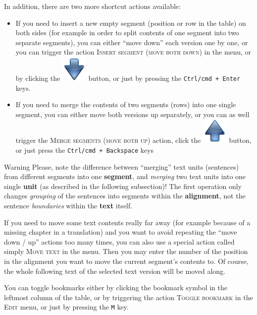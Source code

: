 \documentclass[a4paper,10pt,oneside]{book}
\newcommand{\keys}[1]{\texttt{#1}}
\newcommand{\menu}[1]{\textsc{#1}}
\begin{document}
In addition, there are two more shortcut actions available:

\begin{itemize}
 \item If you need to insert a new empty segment (position or row in the table) on both sides (for example in order to split contents of one segment into two separate segments), you can either ``move down'' each version one by one, or you can trigger the action \menu{Insert segment (move both down)} in the menu, or by clicking the \includegraphics[height=2ex]{../images/48/go-down.png} button, or just by pressing the \keys{Ctrl/cmd + Enter} keys.
 \item If you need to merge the contents of two segments (rows) into one single segment, you can either move both versions up separately, or you can as well trigger the \menu{Merge segments (move both up)} action, click the \includegraphics[height=2ex]{../images/48/go-up.png} button, or just press the \keys{Ctrl/cmd + Backspace} keys
\end{itemize}

\begin{bclogo}[couleur = blue!30, arrondi = 0.1, logo = \bcattention,
ombre = true , epOmbre = 0.125, couleurOmbre = black!30, blur, epBord = 0.3, marge = 5]{Warning}\small
Please, note the difference between ``merging'' text units (sentences) from different segments into one \textbf{segment}, and \emph{merging} two text units into one single \textbf{unit} (as described in the following subsection)! The first operation only changes \emph{grouping} of the sentences into segments within the \textbf{alignment}, not the sentence \emph{boundaries} within the \textbf{text} itself.
\end{bclogo}

If you need to move some text contents really far away (for example because of a missing chapter in a translation) and you want to avoid repeating the ``move down / up'' actions too many times, you can also use a special action called simply \menu{Move text} in the menu. Then you may enter the number of the position in the alignment you want to move the current segment's contents to. Of course, the whole following text of the selected text version will be moved along.

You can toggle bookmarks either by clicking the bookmark symbol in the leftmost column of the table, or by triggering the action \menu{Toggle bookmark} in the \menu{Edit} menu, or just by pressing the \keys{M} key.
\end{document}
